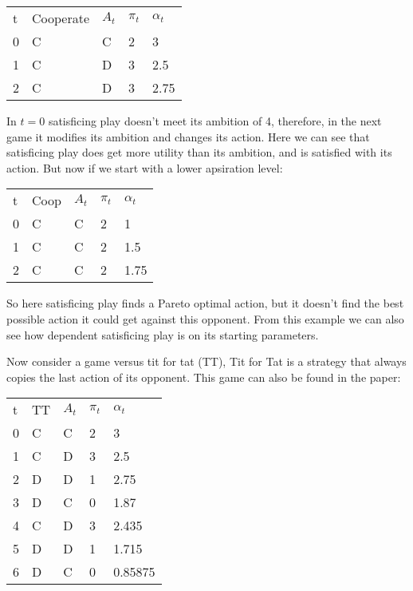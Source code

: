 \begin{tabular}{lllll}
    t & Cooperate & $A_t$ & $\pi_t$ & $\alpha_t$ \\
    0 & C     & C    & 2       & 3 \\
    1 & C     & D    & 3       & 2.5 \\
    2 & C     & D    & 3       & 2.75 \\
\end{tabular}

\toReview In $t=0$ satisficing play doesn't meet its ambition of 4, therefore, in the
next game it modifies its ambition and changes its action. Here we can see
that satisficing play does get more utility than its ambition, and is satisfied
with its action.
But now if we start with a lower apsiration level:

\begin{tabular}{lllll}
  t & Coop & $A_t$ & $\pi_t$ & $\alpha_t$ \\
  0 & C     & C    & 2       & 1 \\
  1 & C     & C    & 2       & 1.5 \\
  2 & C     & C    & 2       & 1.75 \\
\end{tabular}

\toReview So here satisficing play finds a Pareto optimal action, but it doesn't find
the best possible action it could get against this opponent. From this example
we can also see how dependent satisficing play is on its starting parameters.

\toReview Now consider a game versus tit for tat (TT), Tit for Tat is a
strategy that always copies the last action of its opponent.
This game can also be found in the \citep{stimpson:2001} paper:

\begin{tabular}{lllll}
        t & TT & $A_t$ & $\pi_t$ & $\alpha_t$ \\
        0 & C     & C    & 2       & 3  \\
        1 & C     & D    & 3       & 2.5 \\
        2 & D     & D    & 1       & 2.75 \\
        3 & D     & C    & 0       & 1.87 \\
        4 & C     & D    & 3       & 2.435 \\
        5 & D     & D    & 1       & 1.715 \\
        6 & D     & C    & 0       & 0.85875 \\
\end{tabular}

